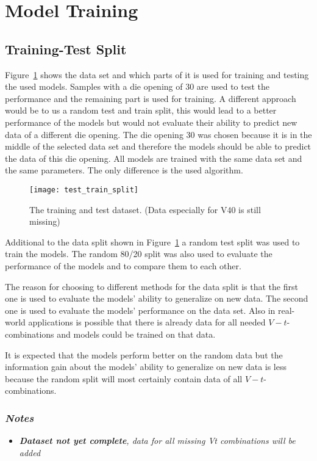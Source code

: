 \section{Model Training}

\subsection{Training-Test Split}
Figure~\ref{fig:train_test_split} shows the data set and which parts of it is used for training and testing the used models. Samples with a die opening of 30 are used to test the performance and the remaining part is used for training.
A different approach would be to us a random test and train split, this would lead to a better performance of the models but would not evaluate their ability to predict new data of a different die opening.
The die opening 30 was chosen because it is in the middle of the selected data set and therefore the models should be able to predict the data of this die opening.
All models are trained with the same data set and the same parameters. The only difference is the used algorithm.


\begin{figure}[H]
    \centering
    \texttt{[image: test\_train\_split]}
    \caption{The training and test dataset. (Data especially for V40 is still missing)}
    \label{fig:train_test_split}
\end{figure}

Additional to the data split shown in Figure~\ref{fig:train_test_split} a random test split was used to train the models. The random 80/20 split was also used to evaluate the performance of the models and to compare them to each other.

The reason for choosing to different methods for the data split is that the first one is used to evaluate the models' ability to generalize on new data. The second one is used to evaluate the models' performance on the data set.
Also in real-world applications is possible that there is already data for all needed $V-t$-combinations and models could be trained on that data.

It is expected that the models perform better on the random data but the information gain about the models' ability to generalize on new data is less because the random split will most certainly contain data of all $V-t$-combinations.


\subsubsection*{\textit{Notes}}
\begin{itemize}
    \item \textit{\textbf{Dataset not yet complete}, data for all missing Vt combinations will be added}
\end{itemize}


